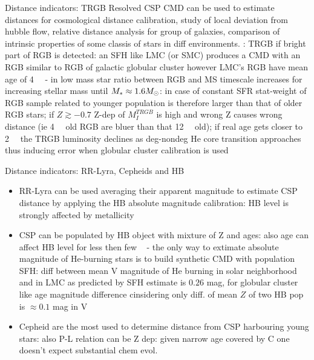 \begin{frame}{Distance indicators: TRGB}
Resolved CSP CMD can be used to estimate distances for cosmological distance calibration, study of local deviation from hubble flow, relative distance analysis for group of galaxies, comparison of intrinsic properties of some classis of stars in diff environments.
: TRGB if bright part of RGB is detected: an SFH like LMC (or SMC) produces a CMD with an RGB similar to RGB of galactic globular cluster however LMC's RGB have mean age of \SI{4}{\giga\year} - in low mass star ratio between RGB and MS timescale increases for increasing stellar mass until $M_*\approx1.6M_{\odot}$: in case of constant SFR stat-weight of RGB sample related to younger population is therefore larger than that of older RGB stars; if $Z\gtrsim-0.7$ Z-dep of $M_I^{TRGB}$ is high and wrong Z causes wrong distance (ie \SI{4}{\giga\year} old RGB are bluer than that \SI{12}{\giga\year} old); if real age gets closer to \SI{2}{\giga\year} the TRGB luminosity declines as deg-nondeg He core transition approaches thus inducing error when globular cluster calibration is used
\end{frame}

\begin{frame}{Distance indicators: RR-Lyra, Cepheids and HB}
\begin{itemize}
\item RR-Lyra can be used averaging their apparent magnitude to estimate CSP distance by applying the HB absolute magnitude calibration: HB level is strongly affected by metallicity
\item CSP can be populated by HB object with mixture of Z and ages: also age can affect HB level for less then few \si{\giga\year} - the only way to extimate absolute magnitude of He-burning stars is to build synthetic CMD with population SFH: diff between mean V magnitude of He burning in solar neighborhood and in LMC as predicted by SFH estimate is $0.26$ mag, for globular cluster like age magnitude difference cinsidering only diff. of mean $Z$ of two HB pop is $\approx0.1$ mag in V
\item Cepheid are the most used to determine distance from CSP harbouring young stars: also P-L relation can be Z dep: given narrow age covered by C one doesn't expect substantial chem evol.
\end{itemize}
\end{frame}


